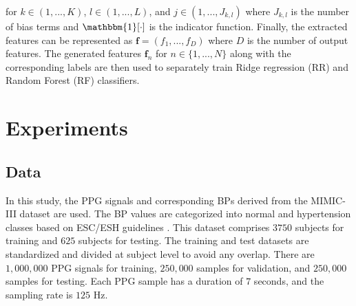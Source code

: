 \documentclass[letterpaper, 10 pt, conference]{ieeeconf}
\begin{document}
for $k\in(1,...,K)$, $l\in(1,...,L)$, and $j\in(1,...,J_{k,l})$ where $J_{k,l}$ is the number of bias terms and $\mathbbm{1}[\cdot]$ is the indicator function. Finally, the extracted features can be represented as $\mathbf{f}=(f_{1},...,f_{D})$ where $D$ is the number of output features. The generated features $\mathbf{f}_n$ for $n\in\{1,...,N\}$ along with the corresponding labels are then used to separately train Ridge regression (RR) and Random Forest (RF) classifiers.

































\section{Experiments}

\subsection{Data}

In this study, the PPG signals and corresponding BPs derived from the MIMIC-III dataset \cite{schrumpf2021assessment} are used. The BP values are categorized into normal and hypertension classes based on ESC/ESH guidelines \cite{mancia20142013}. This dataset comprises $3750$ subjects for training and $625$ subjects for testing. The training and test datasets are standardized and divided at subject level to avoid any overlap. There are $1,000,000$ PPG signals for training, $250,000$ samples for validation, and $250,000$ samples for testing. Each PPG sample has a duration of $7$ seconds, and the sampling rate is $125$ Hz. 
\end{document}
